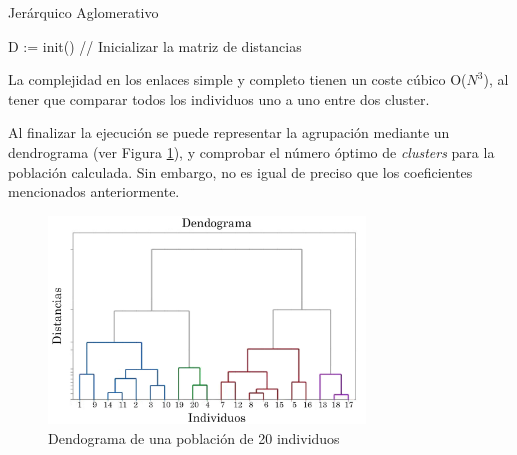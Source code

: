 		\begin{algorithm}[!h]
			\caption{Jerárquico Aglomerativo}
			D := init() // Inicializar la matriz de distancias\\
			
		\end{algorithm}
		\vspace{-0.20cm}

		\noindent La complejidad en los enlaces simple y completo tienen un coste cúbico O(\(N^{3}\)), al tener que comparar todos los individuos uno a uno entre dos cluster.
		

		Al finalizar la ejecución se puede representar la agrupación mediante un dendrograma \cite{espinoza2012using} (ver Figura \ref{fig:dendograma}), y comprobar el número óptimo de \textit{clusters} para la población calculada. Sin embargo, no es igual de preciso que los coeficientes mencionados anteriormente. 
		
		\begin{figure}[!h]
			\centering
			\includegraphics[width=0.75\textwidth]{images/chapter_2/dendograma}
			\caption{Dendograma de una población de 20 individuos}
			\label{fig:dendograma}
		\end{figure}


